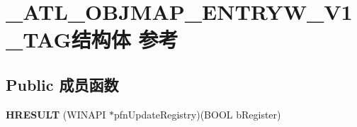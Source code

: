 \hypertarget{struct___a_t_l___o_b_j_m_a_p___e_n_t_r_y_w___v1___t_a_g}{}\section{\+\_\+\+A\+T\+L\+\_\+\+O\+B\+J\+M\+A\+P\+\_\+\+E\+N\+T\+R\+Y\+W\+\_\+\+V1\+\_\+\+T\+A\+G结构体 参考}
\label{struct___a_t_l___o_b_j_m_a_p___e_n_t_r_y_w___v1___t_a_g}
\subsection*{Public 成员函数}
\begin{DoxyCompactItemize}
\item 
\mbox{\label{struct___a_t_l___o_b_j_m_a_p___e_n_t_r_y_w___v1___t_a_g_a62937a457f10616f97fed504320596cd}} 
{\bfseries H\+R\+E\+S\+U\+LT} (W\+I\+N\+A\+PI $\ast$pfn\+Update\+Registry)(B\+O\+OL b\+Register)
\end{DoxyCompactItemize}
